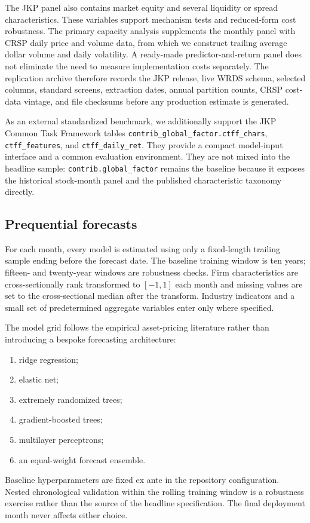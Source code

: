 The JKP panel also contains market equity and several liquidity or spread characteristics. These variables support mechanism tests and reduced-form cost robustness. The primary capacity analysis supplements the monthly panel with CRSP daily price and volume data, from which we construct trailing average dollar volume and daily volatility. A ready-made predictor-and-return panel does not eliminate the need to measure implementation costs separately. The replication archive therefore records the JKP release, live WRDS schema, selected columns, standard screens, extraction dates, annual partition counts, CRSP cost-data vintage, and file checksums before any production estimate is generated.

As an external standardized benchmark, we additionally support the JKP Common Task Framework tables \texttt{contrib\_global\_factor.ctff\_chars}, \texttt{ctff\_features}, and \texttt{ctff\_daily\_ret}. They provide a compact model-input interface and a common evaluation environment. They are not mixed into the headline sample: \texttt{contrib.global\_factor} remains the baseline because it exposes the historical stock-month panel and the published characteristic taxonomy directly.

\subsection{Prequential forecasts}

For each month, every model is estimated using only a fixed-length trailing sample ending before the forecast date. The baseline training window is ten years; fifteen- and twenty-year windows are robustness checks. Firm characteristics are cross-sectionally rank transformed to $[-1,1]$ each month and missing values are set to the cross-sectional median after the transform. Industry indicators and a small set of predetermined aggregate variables enter only where specified.

The model grid follows the empirical asset-pricing literature rather than introducing a bespoke forecasting architecture:
\begin{enumerate}[leftmargin=2em]
\item ridge regression;
\item elastic net;
\item extremely randomized trees;
\item gradient-boosted trees;
\item multilayer perceptrons;
\item an equal-weight forecast ensemble.
\end{enumerate}
Baseline hyperparameters are fixed ex ante in the repository configuration. Nested chronological validation within the rolling training window is a robustness exercise rather than the source of the headline specification. The final deployment month never affects either choice.

